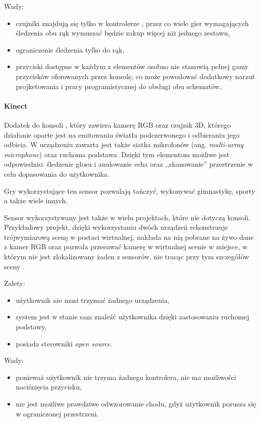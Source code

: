 Wady:
\begin{itemize}
  \item czujniki znajdują się tylko w kontrolerze , przez co wiele gier wymagających śledzenia obu rąk wymuszać będzie zakup więcej niż jednego zestawu,
  \item ograniczenie śledzenia tylko do rąk,
  \item przyciski dostępne w każdym z elementów osobno nie stanowią pełnej gamy przycisków oferowanych przez konsolę, co może powodować dodatkowy narzut projketowania i pracy programistycznej do obsługi obu schematów.
\end{itemize}

\paragraph{Kinect}
Dodatek do konsoli , który zawiera kamerę RGB oraz czujnik 3D, którego działanie oparte jest na emitowaniu światła podczerwonego i odbieraniu jego odbicia. W urządzeniu zawarta jest także siatka mikrofonów (ang. \textsl{multi-array microphone}) oraz ruchoma podstawa. Dzięki tym elementom możliwe jest odpowiednio: śledzenie głosu i anulowanie echa oraz ,,skanowanie'' przestrzenie w celu dopasowania do użytkownika.

Gry wykorzystujące ten sensor pozwalają tańczyć, wykonywać gimnastykę, sporty a także wiele innych.

Sensor wykorzystywany jest także w wielu projektach, które nie dotyczą konsoli. Przykładowy projekt, dzięki wykorzystaniu dwóch urządzeń  rekonstruuje trójwymiarową scenę w postaci wirtualnej, nakłada na nią pobrane na żywo dane z kamer RGB oraz pozwala przesuwać kamerę w wirtualnej scenie w miejsce, w którym nie jest zlokalizowany żaden z sensorów, nie tracąc przy tym szczegółów sceny \citep{TwoKinects}.

Zalety:
\begin{itemize}
  \item użytkownik nie musi trzymać żadnego urządzenia,
  \item system jest w stanie sam znaleźć użytkownika dzięki zastosowaniu ruchomej podstawy,
  \item posiada sterowniki \textsl{open source}.
\end{itemize}

Wady:
\begin{itemize}
  \item ponieważ użytkownik nie trzyma żadnego kontrolera, nie ma możliwości naciśnięcia przycisku,
  \item nie jest możliwe prawdziwe odwzorowanie chodu, gdyż użytkownik porusza się w ograniczonej przestrzeni.
\end{itemize}



